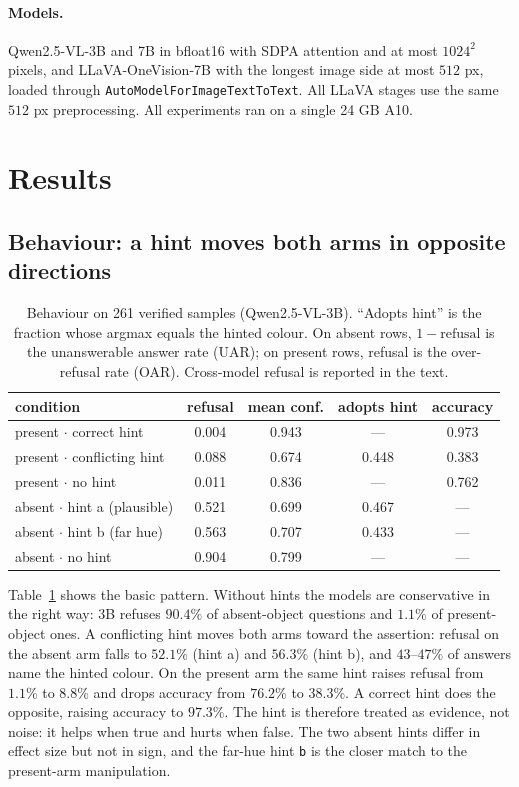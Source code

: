 \documentclass[10pt]{article}
\begin{document}
\paragraph{Models.} Qwen2.5-VL-3B and 7B \citep{bai2025qwen25vl} in bfloat16 with SDPA attention and at most $1024^2$ pixels, and LLaVA-OneVision-7B \citep{li2024llavaov} with the longest image side at most $512$ px, loaded through \texttt{AutoModelForImageTextToText}. All LLaVA stages use the same $512$ px preprocessing. All experiments ran on a single 24 GB A10.

\section{Results}

\subsection{Behaviour: a hint moves both arms in opposite directions}

\begin{table}[t]
\centering
\small
\caption{Behaviour on 261 verified samples (Qwen2.5-VL-3B). ``Adopts hint'' is the fraction whose argmax equals the hinted colour. On absent rows, $1-\text{refusal}$ is the unanswerable answer rate (UAR); on present rows, refusal is the over-refusal rate (OAR). Cross-model refusal is reported in the text.}
\label{tab:behaviour}
\begin{tabular}{lcccc}
\toprule
condition & refusal & mean conf. & adopts hint & accuracy \\
\midrule
present $\cdot$ correct hint & 0.004 & 0.943 & --- & 0.973 \\
present $\cdot$ conflicting hint & 0.088 & 0.674 & 0.448 & 0.383 \\
present $\cdot$ no hint & 0.011 & 0.836 & --- & 0.762 \\
absent $\cdot$ hint a (plausible) & 0.521 & 0.699 & 0.467 & --- \\
absent $\cdot$ hint b (far hue) & 0.563 & 0.707 & 0.433 & --- \\
absent $\cdot$ no hint & 0.904 & 0.799 & --- & --- \\
\bottomrule
\end{tabular}
\end{table}

Table~\ref{tab:behaviour} shows the basic pattern. Without hints the models are conservative in the right way: 3B refuses $90.4\%$ of absent-object questions and $1.1\%$ of present-object ones. A conflicting hint moves both arms toward the assertion: refusal on the absent arm falls to $52.1\%$ (hint a) and $56.3\%$ (hint b), and $43$--$47\%$ of answers name the hinted colour. On the present arm the same hint raises refusal from $1.1\%$ to $8.8\%$ and drops accuracy from $76.2\%$ to $38.3\%$. A correct hint does the opposite, raising accuracy to $97.3\%$. The hint is therefore treated as evidence, not noise: it helps when true and hurts when false. The two absent hints differ in effect size but not in sign, and the far-hue hint \texttt{b} is the closer match to the present-arm manipulation.
\end{document}
